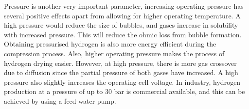 Pressure is another very important parameter, increasing operating pressure has several positive effects apart from allowing for higher operating temperature.  A high pressure would reduce the size of bubbles, and gases increase in solubility with increased pressure. This will reduce the ohmic loss from bubble formation. Obtaining pressurised hydrogen is also more energy efficient during the compression process. Also, higher operating pressure makes the process of hydrogen drying easier. However, at high pressure, there is more gas crossover due to diffusion since the partial pressure of both gases have increased. A high pressure also slightly increases the operating cell voltage. \cite{pressure} In industry, 
hydrogen production at a pressure of up to 30 bar is  commercial available, and this can be achieved by using a feed-water pump.\cite{pressure2} 


